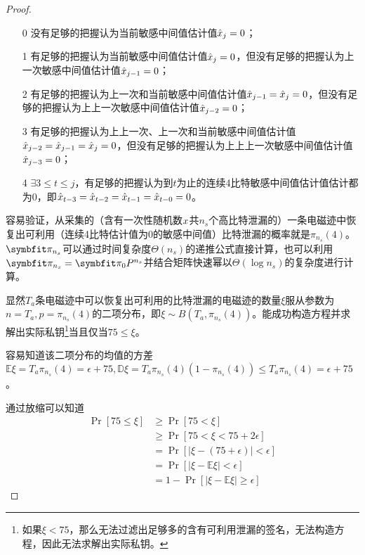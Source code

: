 {\begin{proof}
	\begin{enumerate}
		\item [0] 没有足够的把握认为当前敏感中间值估计值$\hat{x}_j=0$；
		\item [1] 有足够的把握认为当前敏感中间值估计值$\hat{x}_j=0$，但没有足够的把握认为上一次敏感中间值估计值$\hat{x}_{j-1}=0$；
		\item [2] 有足够的把握认为上一次和当前敏感中间值估计值$\hat{x}_{j-1}=\hat{x}_j=0$，但没有足够的把握认为上上一次敏感中间值估计值$\hat{x}_{j-2}=0$；
		\item [3] 有足够的把握认为上上一次、上一次和当前敏感中间值估计值$\hat{x}_{j-2}=\hat{x}_{j-1}=\hat{x}_j=0$，但没有足够的把握认为上上上一次敏感中间值估计值$\hat{x}_{j-3}=0$；
		\item [4] $\exists 3\le t\le j$，有足够的把握认为到$t$为止的连续4比特敏感中间值估计值估计都为0，即$\hat{x}_{t-3}=\hat{x}_{t-2}=\hat{x}_{t-1}=\hat{x}_{t-0}=0$。
	\end{enumerate}

	容易验证，从采集的（含有一次性随机数$x$共$n_s$个高比特泄漏的）一条电磁迹中恢复出可利用（连续4比特估计值为0的敏感中间值）比特泄漏的概率就是$\pi_{n_s}(4)$。$\Vector \pi_{n_s}$可以通过时间复杂度$\Theta(n_s)$的递推公式直接计算，也可以利用$\Vector \pi_{n_s}=\Vector \pi_0 P^{n_s}$并结合矩阵快速幂以$\Theta(\log n_s)$的复杂度进行计算。
		
	
	显然$T_a$条电磁迹中可以恢复出可利用的比特泄漏的电磁迹的数量$\xi$服从参数为$n=T_a,p=\pi_{n_s}(4)$的二项分布，即$\xi\sim B(T_a,\pi_{n_s}(4))$。能成功构造方程并求解出实际私钥\footnote{如果$\xi<75$，那么无法过滤出足够多的含有可利用泄漏的签名，无法构造方程，因此无法求解出实际私钥。}当且仅当$75\le\xi$。
	
	容易知道该二项分布的均值的方差$\mathbb E\xi=T_a\pi_{n_s}(4)=\epsilon+75,\mathbb D\xi=T_a\pi_{n_s}(4)(1-\pi_{n_s}(4))\le T_a\pi_{n_s}(4)=\epsilon+75$。
	
	通过放缩可以知道\begin{align*}
		\Pr\left[75\le\xi\right]&\ge\Pr\left[75<\xi\right]\\
		&\ge\Pr\left[75<\xi<75+2\epsilon\right]\\
		&=\Pr\left[\vert \xi-(75+\epsilon)\vert<\epsilon\right]\\
		&=\Pr\left[\vert \xi-\mathbb E\xi\vert<\epsilon\right]\\
		&=1-\Pr\left[\vert \xi-\mathbb E\xi\vert\ge\epsilon\right]
	\end{align*}
	

\end{proof}}
